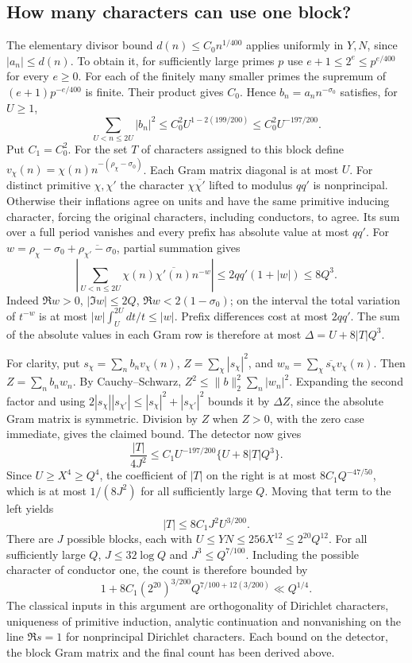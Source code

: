 \subsection{How many characters can use one block?}

The elementary divisor bound \(d(n)\le C_0 n^{1/400}\) applies
uniformly in \(Y,N\), since \(|a_n|\le d(n)\).
To obtain it, for sufficiently large primes \(p\) use
\(e+1\le2^e\le p^{e/400}\) for every \(e\ge0\).
For each of the finitely many smaller primes the supremum of
\((e+1)p^{-e/400}\) is finite. Their product gives \(C_0\).
Hence \(b_n=a_nn^{-\sigma_0}\) satisfies, for \(U\ge1\),
\[
 \sum_{U<n\le2U}|b_n|^2
   \le C_0^2 U^{1-2(199/200)}
   \le C_0^2 U^{-197/200}.
\]
Put \(C_1=C_0^2\). For the set \(T\) of characters assigned to this
block define \(v_\chi(n)=\chi(n)n^{-(\rho_\chi-\sigma_0)}\).
Each Gram matrix diagonal is at most \(U\). For distinct primitive
\(\chi,\chi'\) the character \(\chi\overline{\chi'}\) lifted to
modulus \(qq'\) is nonprincipal. Otherwise their inflations agree
on units and have the same primitive inducing character, forcing
the original characters, including conductors, to agree.
Its sum over a full period vanishes and every prefix has absolute
value at most \(qq'\). For \(w=\rho_\chi-\sigma_0+
\overline{\rho_{\chi'}-\sigma_0}\), partial summation gives
\[
 \left|\sum_{U<n\le2U}\chi(n)\overline{\chi'(n)}n^{-w}\right|
       \le 2qq'(1+|w|)\le8Q^3.
\]
Indeed \(\Re w>0\), \(|\Im w|\le2Q\), \(\Re w<2(1-\sigma_0)\);
on the interval the total variation of \(t^{-w}\) is at most
\(|w|\int_U^{2U}dt/t\le|w|\). Prefix differences cost at most
\(2qq'\). The sum of the absolute values in each Gram row is
therefore at most \(\Delta=U+8|T|Q^3\).

For clarity, put \(s_\chi=\sum_n b_n v_\chi(n)\),
\(Z=\sum_\chi|s_\chi|^2\), and \(w_n=\sum_\chi\overline{s_\chi}
v_\chi(n)\). Then \(Z=\sum_n b_n w_n\). By Cauchy--Schwarz,
\(Z^2\le\|b\|_2^2\sum_n|w_n|^2\). Expanding the second factor and
using \(2|s_\chi||s_{\chi'}|\le |s_\chi|^2+|s_{\chi'}|^2\)
bounds it by \(\Delta Z\), since the absolute Gram matrix is symmetric.
Division by \(Z\) when \(Z>0\), with the zero case immediate, gives the claimed bound.
The detector now gives
\[
 \frac{|T|}{4J^2}
 \le C_1 U^{-197/200}\{U+8|T|Q^3\}.
\]
Since \(U\ge X^4\ge Q^4\), the coefficient of \(|T|\) on the right
is at most \(8C_1Q^{-47/50}\), which is at most \(1/(8J^2)\)
for all sufficiently large \(Q\). Moving that term to the left yields
\[
                 |T|\le8C_1 J^2 U^{3/200}.
\]
There are \(J\) possible blocks, each with
\(U\le YN\le256X^{12}\le2^{20}Q^{12}\). For all sufficiently
large \(Q\), \(J\le32\log Q\) and \(J^3\le Q^{7/100}\).
Including the possible character of conductor one, the count is
therefore bounded by
\[
 1+8C_1 (2^{20})^{3/200}
           Q^{7/100+12(3/200)}\ll Q^{1/4}.
\]
The classical inputs in this argument are orthogonality of
Dirichlet characters, uniqueness of primitive induction, analytic
continuation and nonvanishing on the line \(\Re s=1\) for
nonprincipal Dirichlet characters. Each bound on the detector,
the block Gram matrix and the final count has been derived above.

